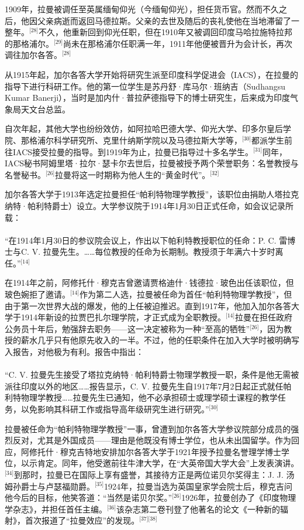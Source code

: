 1909年，拉曼被调任至英属缅甸仰光（今缅甸仰光），担任货币官。然而不久之后，他因父亲病逝而返回马德拉斯。父亲的去世及随后的丧礼使他在当地滞留了一整年。\(^\text{[28]}\)不久，他重新回到仰光任职，但在1910年又被调回印度马哈拉施特拉邦的那格浦尔。\(^\text{[29]}\)尚未在那格浦尔任职满一年，1911年他便被晋升为会计长，再次调往加尔各答。\(^\text{[28]}\)

从1915年起，加尔各答大学开始将研究生派至印度科学促进会（IACS），在拉曼的指导下进行科研工作。他的第一位学生是苏丹舒·库马尔·班纳吉（Sudhangsu Kumar Banerji），当时是加内什·普拉萨德指导下的博士研究生，后来成为印度气象局天文台总监。

自次年起，其他大学也纷纷效仿，如阿拉哈巴德大学、仰光大学、印多尔皇后学院、那格浦尔科学研究所、克里什纳斯学院以及马德拉斯大学等，\(^\text{[30]}\)都派学生前往IACS接受拉曼的指导。到1919年为止，拉曼已指导过十多名学生。\(^\text{[31]}\)同年，IACS秘书阿姆里塔·拉尔·瑟卡尔去世后，拉曼被授予两个荣誉职务：名誉教授与名誉秘书。\(^\text{[26]}\)拉曼将这一时期称为他人生的“黄金时代”。\(^\text{[32]}\)

加尔各答大学于1913年选定拉曼担任“帕利特物理学教授”，该职位由捐助人塔拉克纳特·帕利特爵士）设立。大学参议院于1914年1月30日正式任命，如会议记录所载：\\\\
“在1914年1月30日的参议院会议上，作出以下帕利特教授职位的任命：P. C. 雷博士与C. V. 拉曼先生。……每位教授的任命为长期制。教授须于年满六十岁时离任。”\(^\text{[14]}\)

在1914年之前，阿修托什·穆克吉曾邀请贾格迪什·钱德拉·玻色出任该职位，但玻色婉拒了邀请。\(^\text{[14]}\)作为第二人选，拉曼被任命为首任“帕利特物理学教授”，但由于第一次世界大战的爆发，他的上任被迫推迟。直到1917年，他加入加尔各答大学于1914年新设的拉贾巴扎尔理学院，才正式成为全职教授。\(^\text{[14]}\)拉曼在担任政府公务员十年后，勉强辞去职务——这一决定被称为一种“至高的牺牲”\(^\text{[26]}\)，因为教授的薪水几乎只有他原先收入的一半。不过，他的任职条件在加入大学时被明确写入报告，对他极为有利。报告中指出：\\\\
“C. V. 拉曼先生接受了塔拉克纳特·帕利特爵士物理学教授一职，条件是他无需被派往印度以外的地区……报告显示，C. V. 拉曼先生自1917年7月2日起正式就任帕利特物理学教授……拉曼先生已通知，他不必承担硕士或理学硕士课程的教学任务，以免影响其科研工作或指导高年级研究生进行研究。”\(^\text{[30]}\)

拉曼被任命为“帕利特物理学教授”一事，曾遭到加尔各答大学参议院部分成员的强烈反对，尤其是外国成员——理由是他既没有博士学位，也从未出国留学。作为回应，阿修托什·穆克吉特地安排加尔各答大学于1921年授予拉曼名誉理学博士学位，以示肯定。同年，他受邀前往牛津大学，在“大英帝国大学大会”上发表演讲。\(^\text{[34]}\)到那时，拉曼已在国际上享有盛誉，其接待方正是两位诺贝尔奖得主：J. J. 汤姆孙爵士与卢瑟福勋爵。\(^\text{[35]}\)1924年，拉曼当选为英国皇家学会院士后，穆克吉问他今后的目标，他笑答道：“当然是诺贝尔奖。”\(^\text{[26]}\)1926年，拉曼创办了《印度物理学杂志》，并担任首任主编。\(^\text{[36]}\)该杂志第二卷刊登了他著名的论文《一种新的辐射》，首次报道了“拉曼效应”的发现。\(^\text{[37][38]}\)

